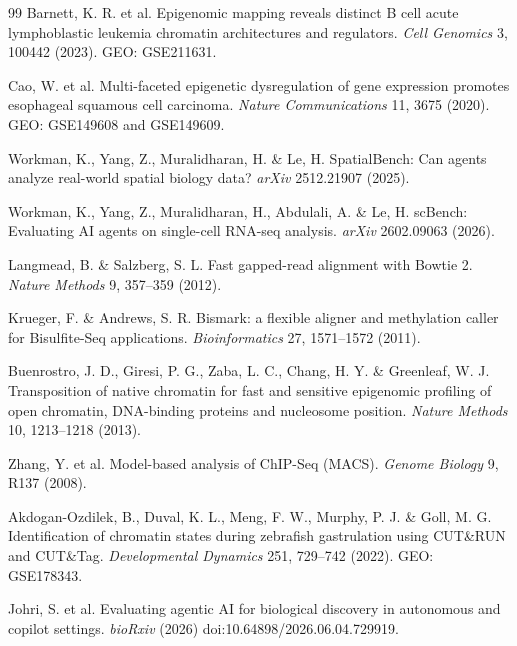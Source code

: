 {\begin{thebibliography}{99}
 Barnett, K. R. et al. Epigenomic mapping reveals
distinct B cell acute lymphoblastic leukemia chromatin architectures and
regulators. \textit{Cell Genomics} 3, 100442 (2023). GEO: GSE211631.

 Cao, W. et al. Multi-faceted epigenetic dysregulation
of gene expression promotes esophageal squamous cell carcinoma. \textit{Nature
Communications} 11, 3675 (2020). GEO: GSE149608 and GSE149609.

 Workman, K., Yang, Z.,
Muralidharan, H. \& Le, H. SpatialBench: Can agents analyze real-world
spatial biology data? \textit{arXiv} 2512.21907 (2025).

 Workman, K., Yang, Z., Muralidharan, H.,
Abdulali, A. \& Le, H. scBench: Evaluating AI agents on single-cell RNA-seq
analysis. \textit{arXiv} 2602.09063 (2026).

 Langmead, B. \& Salzberg, S. L. Fast
gapped-read alignment with Bowtie 2. \textit{Nature Methods} 9, 357--359
(2012).

 Krueger, F. \& Andrews, S. R. Bismark: a
flexible aligner and methylation caller for Bisulfite-Seq applications.
\textit{Bioinformatics} 27, 1571--1572 (2011).

 Buenrostro, J. D., Giresi, P. G., Zaba,
L. C., Chang, H. Y. \& Greenleaf, W. J. Transposition of native chromatin
for fast and sensitive epigenomic profiling of open chromatin, DNA-binding
proteins and nucleosome position. \textit{Nature Methods} 10, 1213--1218
(2013).

 Zhang, Y. et al. Model-based analysis of ChIP-Seq
(MACS). \textit{Genome Biology} 9, R137 (2008).

 Akdogan-Ozdilek, B., Duval, K. L., Meng, F. W.,
Murphy, P. J. \& Goll, M. G. Identification of chromatin states during zebrafish
gastrulation using CUT\&RUN and CUT\&Tag. \textit{Developmental Dynamics} 251,
729--742 (2022). GEO: GSE178343.

 Johri, S. et al. Evaluating agentic AI for biological
discovery in autonomous and copilot settings. \textit{bioRxiv} (2026)
doi:10.64898/2026.06.04.729919.

\end{thebibliography}
}
